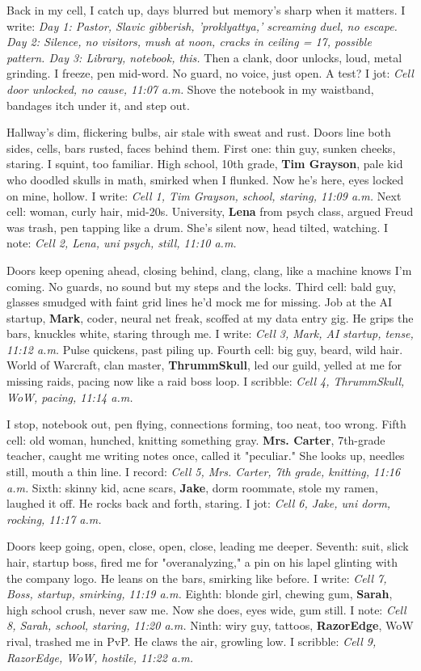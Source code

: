 \documentclass{article}
\begin{document}
Back in my cell, I catch up, days blurred but memory's sharp when it matters. I write: \textit{Day 1: Pastor, Slavic gibberish, 'proklyattya,' screaming duel, no escape. Day 2: Silence, no visitors, mush at noon, cracks in ceiling = 17, possible pattern. Day 3: Library, notebook, this.} Then a clank, door unlocks, loud, metal grinding. I freeze, pen mid-word. No guard, no voice, just open. A test? I jot: \textit{Cell door unlocked, no cause, 11:07 a.m.} Shove the notebook in my waistband, bandages itch under it, and step out.

Hallway's dim, flickering bulbs, air stale with sweat and rust. Doors line both sides, cells, bars rusted, faces behind them. First one: thin guy, sunken cheeks, staring. I squint, too familiar. High school, 10th grade, \textbf{Tim Grayson}, pale kid who doodled skulls in math, smirked when I flunked. Now he's here, eyes locked on mine, hollow. I write: \textit{Cell 1, Tim Grayson, school, staring, 11:09 a.m.} Next cell: woman, curly hair, mid-20s. University, \textbf{Lena} from psych class, argued Freud was trash, pen tapping like a drum. She's silent now, head tilted, watching. I note: \textit{Cell 2, Lena, uni psych, still, 11:10 a.m.}

Doors keep opening ahead, closing behind, clang, clang, like a machine knows I'm coming. No guards, no sound but my steps and the locks. Third cell: bald guy, glasses smudged with faint grid lines he'd mock me for missing. Job at the AI startup, \textbf{Mark}, coder, neural net freak, scoffed at my data entry gig. He grips the bars, knuckles white, staring through me. I write: \textit{Cell 3, Mark, AI startup, tense, 11:12 a.m.} Pulse quickens, past piling up. Fourth cell: big guy, beard, wild hair. World of Warcraft, clan master, \textbf{ThrummSkull}, led our guild, yelled at me for missing raids, pacing now like a raid boss loop. I scribble: \textit{Cell 4, ThrummSkull, WoW, pacing, 11:14 a.m.}

I stop, notebook out, pen flying, connections forming, too neat, too wrong. Fifth cell: old woman, hunched, knitting something gray. \textbf{Mrs. Carter}, 7th-grade teacher, caught me writing notes once, called it "peculiar." She looks up, needles still, mouth a thin line. I record: \textit{Cell 5, Mrs. Carter, 7th grade, knitting, 11:16 a.m.} Sixth: skinny kid, acne scars, \textbf{Jake}, dorm roommate, stole my ramen, laughed it off. He rocks back and forth, staring. I jot: \textit{Cell 6, Jake, uni dorm, rocking, 11:17 a.m.}

Doors keep going, open, close, open, close, leading me deeper. Seventh: suit, slick hair, startup boss, fired me for "overanalyzing," a pin on his lapel glinting with the company logo. He leans on the bars, smirking like before. I write: \textit{Cell 7, Boss, startup, smirking, 11:19 a.m.} Eighth: blonde girl, chewing gum, \textbf{Sarah}, high school crush, never saw me. Now she does, eyes wide, gum still. I note: \textit{Cell 8, Sarah, school, staring, 11:20 a.m.} Ninth: wiry guy, tattoos, \textbf{RazorEdge}, WoW rival, trashed me in PvP. He claws the air, growling low. I scribble: \textit{Cell 9, RazorEdge, WoW, hostile, 11:22 a.m.}
\end{document}
